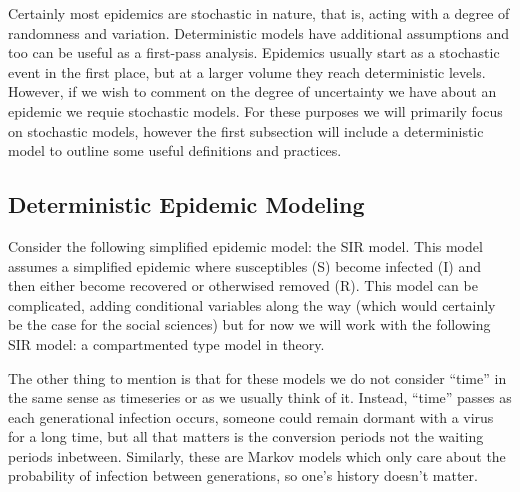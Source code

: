 \documentclass[12pt]{article}\usepackage[]{graphicx}\usepackage[]{color}
\begin{document}
\begin{flushleft}
Certainly most epidemics are stochastic in nature, that is, acting with a degree of randomness and variation. Deterministic models have additional assumptions and too can be useful as a first-pass analysis. Epidemics usually start as a stochastic event in the first place, but at a larger volume they reach deterministic levels. However, if we wish to comment on the degree of uncertainty we have about an epidemic we requie stochastic models. For these purposes we will primarily focus on stochastic models, however the first subsection will include a deterministic model to outline some useful definitions and practices.

\subsection{Deterministic Epidemic Modeling}

Consider the following simplified epidemic model: the SIR model. This model assumes a simplified epidemic where susceptibles (S) become infected (I) and then either become recovered or otherwised removed (R). This model can be complicated, adding conditional variables along the way (which would certainly be the case for the social sciences) but for now we will work with the following SIR model: a compartmented type model in theory. 

\begin{center}

\end{center}

The other thing to mention is that for these models we do not consider ``time'' in the same sense as timeseries or as we usually think of it. Instead, ``time'' passes as each generational infection occurs, someone could remain dormant with a virus for a long time, but all that matters is the conversion periods not the waiting periods inbetween. Similarly, these are Markov models which only care about the probability of infection between generations, so one's history doesn't matter.



\end{flushleft}
\end{document}
